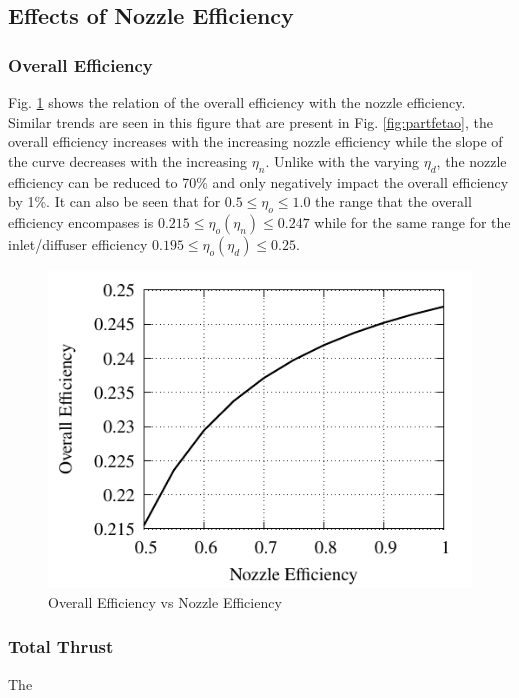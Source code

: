 \documentclass[conf]{new-aiaa} %
\begin{document}
\subsection{Effects of Nozzle Efficiency} %

\subsubsection{Overall Efficiency}
Fig. \ref{fig:partgetao} shows the relation of the overall efficiency with the nozzle efficiency. Similar trends are seen in this figure that are present in Fig. \ref{fig:partfetao}, the overall efficiency increases with the increasing nozzle efficiency while the slope of the curve decreases with the increasing $\eta_n$. Unlike with the varying $\eta_d$, the nozzle efficiency can be reduced to 70\% and only negatively impact the overall efficiency by 1\%. It can also be seen that for $0.5\leq\eta_o\leq1.0$ the range that the overall efficiency encompases is $0.215\leq\eta_o\left(\eta_n\right)\leq0.247$ while for the same range for the inlet/diffuser efficiency $0.195\leq\eta_o\left(\eta_d\right)\leq0.25$.

\begin{figure}[H] %
    \centering
    \includegraphics[]{media/performance_parameter_files/part_g_eta_o.pdf}
    \caption{\label{fig:partgetao}Overall Efficiency vs Nozzle Efficiency}
\end{figure}

\subsubsection{Total Thrust}
The
\end{document}
